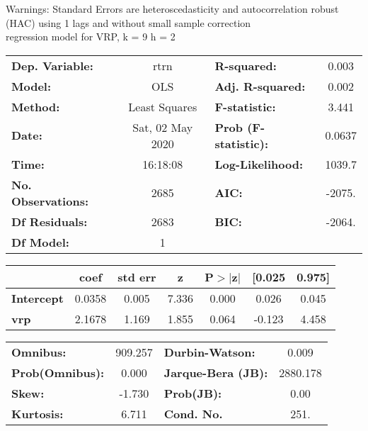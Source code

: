 Warnings: \newline
 [1] Standard Errors are heteroscedasticity and autocorrelation robust (HAC) using 1 lags and without small sample correction\\ 

regression model for VRP, k = 9 h = 2\begin{center}
\begin{tabular}{lclc}
\toprule
\textbf{Dep. Variable:}    &       rtrn       & \textbf{  R-squared:         } &     0.003   \\
\textbf{Model:}            &       OLS        & \textbf{  Adj. R-squared:    } &     0.002   \\
\textbf{Method:}           &  Least Squares   & \textbf{  F-statistic:       } &     3.441   \\
\textbf{Date:}             & Sat, 02 May 2020 & \textbf{  Prob (F-statistic):} &   0.0637    \\
\textbf{Time:}             &     16:18:08     & \textbf{  Log-Likelihood:    } &    1039.7   \\
\textbf{No. Observations:} &        2685      & \textbf{  AIC:               } &    -2075.   \\
\textbf{Df Residuals:}     &        2683      & \textbf{  BIC:               } &    -2064.   \\
\textbf{Df Model:}         &           1      & \textbf{                     } &             \\
\bottomrule
\end{tabular}
\begin{tabular}{lcccccc}
                   & \textbf{coef} & \textbf{std err} & \textbf{z} & \textbf{P$> |$z$|$} & \textbf{[0.025} & \textbf{0.975]}  \\
\midrule
\textbf{Intercept} &       0.0358  &        0.005     &     7.336  &         0.000        &        0.026    &        0.045     \\
\textbf{vrp}       &       2.1678  &        1.169     &     1.855  &         0.064        &       -0.123    &        4.458     \\
\bottomrule
\end{tabular}
\begin{tabular}{lclc}
\textbf{Omnibus:}       & 909.257 & \textbf{  Durbin-Watson:     } &    0.009  \\
\textbf{Prob(Omnibus):} &   0.000 & \textbf{  Jarque-Bera (JB):  } & 2880.178  \\
\textbf{Skew:}          &  -1.730 & \textbf{  Prob(JB):          } &     0.00  \\
\textbf{Kurtosis:}      &   6.711 & \textbf{  Cond. No.          } &     251.  \\
\bottomrule
\end{tabular}
\end{center}

